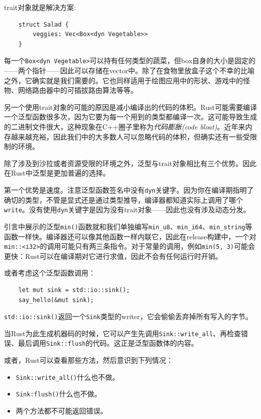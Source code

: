 trait对象就是解决方案:
\begin{verbatim}
    struct Salad {
        veggies: Vec<Box<dyn Vegetable>>
    }
\end{verbatim}

每一个\texttt{Box<dyn Vegetable>}可以持有任何类型的蔬菜，但box自身的大小是固定的——两个指针——因此可以存储在vector中。除了在食物里放盒子这个不幸的比喻之外，它确实就是我们需要的。它也同样适用于绘图应用中的形状、游戏中的怪物、网络路由器中的可插拔路由算法等等。

另一个使用trait对象的可能的原因是减小编译出的代码的体积。Rust可能需要编译一个泛型函数很多次，因为它要为每一个用到的类型都编译一次。这可能导致生成的二进制文件很大，这种现象在C++圈子里称为\emph{代码膨胀(code bloat)}。近年来内存越来越充裕，因此我们中的大多数人可以忽略代码的体积，但确实还有一些受限制的环境。

除了涉及到沙拉或者资源受限的环境之外，泛型与trait对象相比有三个优势。因此在Rust中泛型是更加普遍的选择。

第一个优势是速度。注意泛型函数签名中没有\texttt{dyn}关键字。因为你在编译期指明了确切的类型，不管是显式还是通过类型推导，编译器都知道实际上调用了哪个\texttt{write}。没有使用\texttt{dyn}关键字是因为没有trait对象——因此也没有涉及动态分发。

引言中展示的泛型\texttt{min()}函数就和我们单独编写\texttt{min\_u8}、\texttt{min\_i64}、\texttt{min\_string}等函数一样快。编译器还可以像其他函数一样内联它，因此在release构建中，一个对\texttt{min::<i32>}的调用可能只有两三条指令。对于常量的调用，例如\texttt{min(5, 3)}可能会更快：Rust可以在编译期对它进行求值，因此不会有任何运行时开销。

或者考虑这个泛型函数调用：
\begin{verbatim}
    let mut sink = std::io::sink();
    say_hello(&mut sink);
\end{verbatim}

\texttt{std::io::sink()}返回一个\texttt{Sink}类型的writer，它会偷偷丢弃掉所有写入的字节。

当Rust为此生成机器码的时候，它可以产生先调用\texttt{Sink::write\_all}、再检查错误、最后调用\texttt{Sink::flush}的代码。这正是泛型函数体的内容。

或者，Rust可以查看那些方法，然后意识到下列情况：
\begin{itemize}
    \item \texttt{Sink::write\_all()}什么也不做。
    \item \texttt{Sink:flush()}什么也不做。
    \item 两个方法都不可能返回错误。
\end{itemize}

